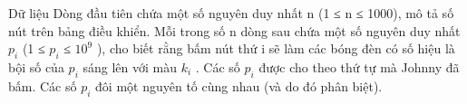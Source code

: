 Dữ liệu  
Dòng đầu tiên chứa một số nguyên duy nhất n (1 ≤ n ≤ 1000), mô tả số nút trên bảng điều khiển. Mỗi trong số n dòng sau chứa một số nguyên duy nhất $p_{i}$   (1 ≤ $p_{i}$   ≤ $10^{9}$   ), cho biết rằng bấm nút thứ i sẽ làm các bóng đèn có số hiệu là bội số của $p_{i}$   sáng lên với màu $k_{i}$   . Các số $p_{i}$   được cho theo thứ tự mà Johnny đã bấm. Các số $p_{i}$   đôi một nguyên tố cùng nhau (và do đó phân biệt).